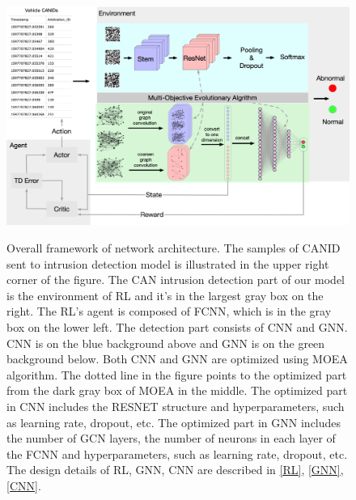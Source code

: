 \documentclass[lettersize,journal]{IEEEtran}
\begin{document}
\begin{figure}[!t]
\centering
{\includegraphics[width=7in]{evo-frame}%
\label{Overall framework of network architecture.}}
\hfil
\caption{Overall framework of network architecture. The samples of CANID sent to intrusion detection model is illustrated in the upper right corner of the figure. The CAN intrusion detection part of our model is the environment of RL and it’s in the largest gray box on the right. The RL’s agent is composed of FCNN, which is in the gray box on the lower left. The detection part consists of CNN and GNN. CNN is on the blue background above and GNN is on the green background below. Both CNN and GNN are optimized using MOEA algorithm. The dotted line in the figure points to the optimized part from the dark gray box of MOEA in the middle. The optimized part in CNN includes the RESNET structure and hyperparameters, such as learning rate, dropout, etc. The optimized part in GNN includes the number of GCN layers, the number of neurons in each layer of the FCNN and hyperparameters, such as learning rate, dropout, etc. The design details of RL, GNN, CNN are described in \ref{RL}, \ref{GNN}, \ref{CNN}.}
\label{fig_2}
\end{figure}
\end{document}
